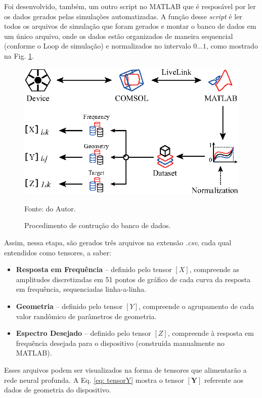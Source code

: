 Foi desenvolvido, também, um outro script no MATLAB que é resposável por ler os dados gerados pelas simulações automatizadas. A função desse \textit{script} é ler todos os arquivos de simulação que foram gerados e montar o banco de dados em um único arquivo, onde os dados estão organizados de maneira sequencial (conforme o Loop de simulação) e normalizados no intervalo $0\dotso 1$, como mostrado na Fig. \ref{fig: DatasetBuilding}.

\begin{figure}[H]
    \centering
    \includegraphics{04-Figuras/DatasetBuilding.eps}
    \caption{Procedimento de contrução do banco de dados.} \par
    Fonte: do Autor.
    \label{fig: DatasetBuilding}
\end{figure}

Assim, nessa etapa, são gerados três arquivos na extensão \textit{.csv}, cada qual entendidos como tensores, a saber:

\begin{itemize}
	\item \textbf{Resposta em Frequência} -- definido pelo tensor $[X]$, compreende as amplitudes discretizadas em 51 pontos de gráfico de cada curva da resposta em frequência, sequenciadas linha-a-linha.
	\item \textbf{Geometria} -- definido pelo tensor $[Y]$, compreende o agrupamento de cada valor randômico de parâmetros de geometria.
	\item \textbf{Espectro Desejado} -- definido pelo tensor $[Z]$, compreende à resposta em frequência desejada para o dispositivo (construída manualmente no MATLAB).
\end{itemize}

Esses arquivos podem ser visualizados na forma de tensores que alimentarão a rede neural profunda. A Eq. \ref{eq: tensorY} mostra o tensor $\mathbf{[Y]}$ referente aos dados de geometria do dispositivo.

